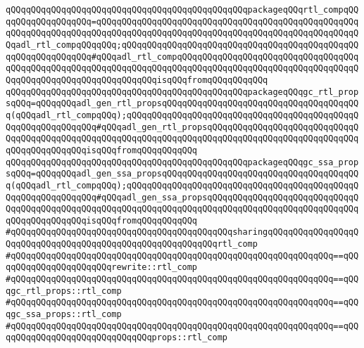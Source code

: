 \verb|qQQqqQQqqQQqqQQqqQQqqQQqqQQqqQQqqQQqqQQqqQQqqQQqpackageqQQqrtl_compqQQqqQQqqQQqqQQqqQQq=qQQqqQQqqQQqqQQqqQQqqQQqqQQqqQQqqQQqqQQqqQQqqQQqqQQqqQQqqQQqqQQqqQQqqQQqqQQqqQQqqQQqqQQqqQQqqQQqqQQqqQQqqQQqqQQqqQQqqQQqqQQqadl_rtl_compqQQqqQQq;qQQqqQQqqQQqqQQqqQQqqQQqqQQqqQQqqQQqqQQqqQQqqQQqqQQqqQQqqQQqqQQq#qQQqadl_rtl_compqQQqqQQqqQQqqQQqqQQqqQQqqQQqqQQqqQQqqQQqqQQqqQQqqQQqqQQqqQQqqQQqqQQqqQQqqQQqqQQqqQQqqQQqqQQqqQQqqQQqqQQqqQQqqQQqqQQqqQQqqQQqqQQqqQQqqQQqisqQQqfromqQQqqQQqqQQq|\newline
\verb|qQQqqQQqqQQqqQQqqQQqqQQqqQQqqQQqqQQqqQQqqQQqqQQqpackageqQQqgc_rtl_propsqQQq=qQQqqQQqadl_gen_rtl_propsqQQqqQQqqQQqqQQqqQQqqQQqqQQqqQQqqQQqqQQq(qQQqadl_rtl_compqQQq);qQQqqQQqqQQqqQQqqQQqqQQqqQQqqQQqqQQqqQQqqQQqqQQqqQQqqQQqqQQqqQQq#qQQqadl_gen_rtl_propsqQQqqQQqqQQqqQQqqQQqqQQqqQQqqQQqqQQqqQQqqQQqqQQqqQQqqQQqqQQqqQQqqQQqqQQqqQQqqQQqqQQqqQQqqQQqqQQqqQQqqQQqqQQqqQQqqQQqisqQQqfromqQQqqQQqqQQq|\newline
\verb|qQQqqQQqqQQqqQQqqQQqqQQqqQQqqQQqqQQqqQQqqQQqqQQqpackageqQQqgc_ssa_propsqQQq=qQQqqQQqadl_gen_ssa_propsqQQqqQQqqQQqqQQqqQQqqQQqqQQqqQQqqQQqqQQq(qQQqadl_rtl_compqQQq);qQQqqQQqqQQqqQQqqQQqqQQqqQQqqQQqqQQqqQQqqQQqqQQqqQQqqQQqqQQqqQQq#qQQqadl_gen_ssa_propsqQQqqQQqqQQqqQQqqQQqqQQqqQQqqQQqqQQqqQQqqQQqqQQqqQQqqQQqqQQqqQQqqQQqqQQqqQQqqQQqqQQqqQQqqQQqqQQqqQQqqQQqqQQqqQQqqQQqisqQQqfromqQQqqQQqqQQq|\newline
\newline
\verb|#qQQqqQQqqQQqqQQqqQQqqQQqqQQqqQQqqQQqqQQqqQQqsharingqQQqqQQqqQQqqQQqqQQqqQQqqQQqqQQqqQQqqQQqqQQqqQQqqQQqqQQqqQQqrtl_comp|\newline
\verb|#qQQqqQQqqQQqqQQqqQQqqQQqqQQqqQQqqQQqqQQqqQQqqQQqqQQqqQQqqQQqqQQq==qQQqqQQqqQQqqQQqqQQqqQQqrewrite::rtl_comp|\newline
\verb|#qQQqqQQqqQQqqQQqqQQqqQQqqQQqqQQqqQQqqQQqqQQqqQQqqQQqqQQqqQQqqQQq==qQQqgc_rtl_props::rtl_comp|\newline
\verb|#qQQqqQQqqQQqqQQqqQQqqQQqqQQqqQQqqQQqqQQqqQQqqQQqqQQqqQQqqQQqqQQq==qQQqgc_ssa_props::rtl_comp|\newline
\verb|#qQQqqQQqqQQqqQQqqQQqqQQqqQQqqQQqqQQqqQQqqQQqqQQqqQQqqQQqqQQqqQQq==qQQqqQQqqQQqqQQqqQQqqQQqqQQqqQQqprops::rtl_comp|\newline
